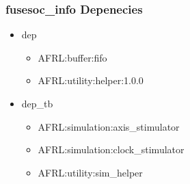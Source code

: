 \subsubsection{fusesoc\_info Depenecies}
\begin{itemize}
\item dep
	\begin{itemize}
	\item AFRL:buffer:fifo
	\item AFRL:utility:helper:1.0.0
	\end{itemize}
\item dep\_tb
	\begin{itemize}
	\item AFRL:simulation:axis\_stimulator
	\item AFRL:simulation:clock\_stimulator
	\item AFRL:utility:sim\_helper
	\end{itemize}
\end{itemize}
